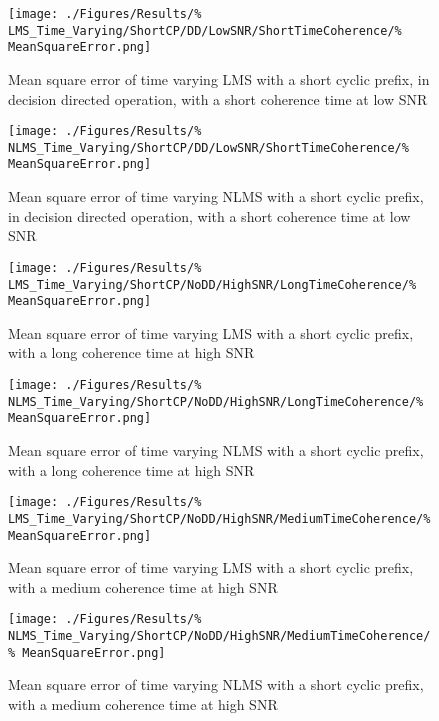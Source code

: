 \begin{figure}[ht]
	\centering
	\begin{minipage}{0.49\textwidth}
		\centering
		\texttt{[image: ./Figures/Results/\%
	LMS\_Time\_Varying/ShortCP/DD/LowSNR/ShortTimeCoherence/\%
	MeanSquareError.png]}
		\captionsetup{width=0.75\linewidth}
		\caption{Mean square error of time varying LMS with a 
		short cyclic prefix, in decision directed operation, 
		with a short coherence time at low SNR}
	\end{minipage}
	\begin{minipage}{0.49\textwidth}
		\centering
		\texttt{[image: ./Figures/Results/\%
	NLMS\_Time\_Varying/ShortCP/DD/LowSNR/ShortTimeCoherence/\%
	MeanSquareError.png]}
		\captionsetup{width=0.75\linewidth}
		\caption{Mean square error of time varying NLMS with 
		a short cyclic prefix, in decision directed 
		operation, with a short coherence time at low SNR}
	\end{minipage}
\end{figure}

\begin{figure}[ht]
	\centering
	\begin{minipage}{0.49\textwidth}
		\centering
		\texttt{[image: ./Figures/Results/\%
	LMS\_Time\_Varying/ShortCP/NoDD/HighSNR/LongTimeCoherence/\%
	MeanSquareError.png]}
		\captionsetup{width=0.75\linewidth}
		\caption{Mean square error of time varying LMS with a 
		short cyclic prefix, with a long coherence time at 
		high SNR}
	\end{minipage}
	\begin{minipage}{0.49\textwidth}
		\centering
		\texttt{[image: ./Figures/Results/\%
	NLMS\_Time\_Varying/ShortCP/NoDD/HighSNR/LongTimeCoherence/\%
	MeanSquareError.png]}
		\captionsetup{width=0.75\linewidth}
		\caption{Mean square error of time varying NLMS with 
		a short cyclic prefix, with a long coherence time at 
		high SNR}
	\end{minipage}
\end{figure}

\begin{figure}[ht]
	\centering
	\begin{minipage}{0.49\textwidth}
		\centering
		\texttt{[image: ./Figures/Results/\%
	LMS\_Time\_Varying/ShortCP/NoDD/HighSNR/MediumTimeCoherence/\%
	MeanSquareError.png]}
		\captionsetup{width=0.75\linewidth}
		\caption{Mean square error of time varying LMS with a 
		short cyclic prefix, with a medium coherence time at 
		high SNR}
	\end{minipage}
	\begin{minipage}{0.49\textwidth}
		\centering
		\texttt{[image: ./Figures/Results/\%
	NLMS\_Time\_Varying/ShortCP/NoDD/HighSNR/MediumTimeCoherence/\%
	MeanSquareError.png]}
		\captionsetup{width=0.75\linewidth}
		\caption{Mean square error of time varying NLMS with 
		a short cyclic prefix, with a medium coherence 
		time at high SNR}
	\end{minipage}
\end{figure}

